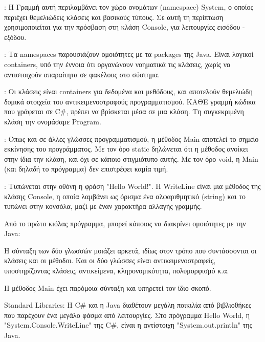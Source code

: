 

: Η Γραμμή αυτή περιλαμβάνει τον χώρο ονομάτων (namespace) System, ο οποίος περιέχει θεμελιώδεις κλάσεις και βασικούς τύπους. Σε αυτή τη περίπτωση χρησιμοποιείται για την πρόσβαση στη κλάση Console, για λειτουργίες εισόδου - εξόδου.

: Τα namespaces παρουσιάζουν ομοιότητες με τα packages της Java. Είναι λογικοί containers, υπό την έννοια ότι οργανώνουν νοηματικά τις κλάσεις, χωρίς να αντιστοιχούν απαραίτητα σε φακέλους στο σύστημα.

: Οι κλάσεις είναι containers για δεδομένα και μεθόδους, και αποτελούν θεμελιώδη δομικά στοιχεία του αντικειμενοστραφούς προγραμματισμού. ΚΑΘΕ γραμμή κώδικα που γράφεται σε C\#, πρέπει να βρίσκεται μέσα σε μια κλάση. Τη συγκεκριμένη κλάση την ονομάσαμε Program.

: Όπως και σε άλλες γλώσσες προγραμματισμού, η μέθοδος Main αποτελεί το σημείο εκκίνησης του προγράμματος. Με τον όρο static δηλώνεται ότι η μέθοδος ανοίκει στην ίδια την κλάση, και όχι σε κάποιο στιγμιότυπο αυτής. Με τον όρο void, η Main (και δηλαδή το πρόγραμμα) δεν επιστρέφει καμία τιμή. 

: Τυπώνεται στην οθόνη η φράση "Hello World!". Η WriteLine είναι μια μέθοδος της κλάσης Console, η οποία λαμβάνει ως όρισμα ένα αλφαριθμητικό (string) και το τυπώνει στην κονσόλα, μαζί με έναν χαρακτήρα αλλαγής γραμμής.

Από το πρώτο κιόλας πρόγραμμα, μπορεί κάποιος να διακρίνει ομοιότητες με την Java: 

Η σύνταξη των δύο γλωσσών μοιάζει αρκετά, ιδίως στον τρόπο που συντάσσονται οι κλάσεις και οι μέθοδοι. Και οι δύο γλώσσες είναι αντικειμενοστραφείς, υποστηρίζοντας κλάσεις, αντικείμενα, κληρονομικότητα, πολυμορφισμό κ.α.

Η μέθοδος Main έχει παρόμοια σύνταξη και υπηρετεί τον ίδιο σκοπό. 

Standard Libraries: H C\# και η Java διαθέτουν μεγάλη ποικιλία από βιβλιοθήκες που παρέχουν ένα μεγάλο φάσμα από λειτουργίες. Στο πρόγραμμα Hello World, η "System.Console.WriteLine" της C\#, είναι η αντίστοιχη "System.out.println" της Java. 